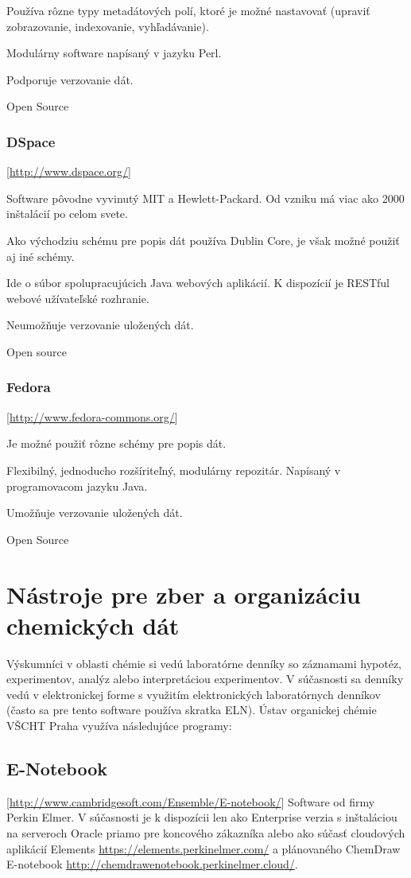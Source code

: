 \documentclass[thesis=M,slovak]{FITthesis}[2013/05/06]
\begin{document}
Používa rôzne typy metadátových polí, ktoré je možné nastavovať (upraviť zobrazovanie, indexovanie, vyhľadávanie).

Modulárny software napísaný v jazyku Perl.

Podporuje verzovanie dát.

Open Source

\subsubsection {DSpace} [\url{http://www.dspace.org/}]

Software pôvodne vyvinutý MIT a Hewlett-Packard. Od vzniku má viac ako 2000 inštalácií po celom svete. 

Ako východziu schému pre popis dát používa Dublin Core, je však možné použiť aj iné schémy.

Ide o súbor spolupracujúcich Java webových aplikácií. K dispozícií je RESTful webové užívateľské rozhranie.

Neumožňuje verzovanie uložených dát.

Open source

\subsubsection {Fedora} [\url{http://www.fedora-commons.org/}]

Je možné použiť rôzne schémy pre popis dát.

Flexibilný, jednoducho rozšíriteľný, modulárny repozitár. Napísaný v programovacom jazyku Java.

Umožňuje verzovanie uložených dát.

Open Source


\section{Nástroje pre zber a organizáciu chemických dát}
Výskumníci v oblasti chémie si vedú laboratórne denníky so záznamami hypotéz, experimentov, analýz alebo interpretáciou experimentov. V súčasnosti sa denníky vedú v elektronickej forme s využitím elektronických laboratórnych denníkov (často sa pre tento software používa skratka ELN). Ústav organickej chémie VŠCHT Praha využíva následujúce programy:
\subsection{E-Notebook} [\url{http://www.cambridgesoft.com/Ensemble/E-notebook/}]
Software od firmy Perkin Elmer. V súčasnosti je k dispozícii len ako Enterprise verzia s inštaláciou na serveroch Oracle priamo pre koncového zákazníka alebo ako súčasť cloudových aplikácií Elements \url{https://elements.perkinelmer.com/} a plánovaného ChemDraw E-notebook \url{http://chemdrawenotebook.perkinelmer.cloud/}.
\end{document}
